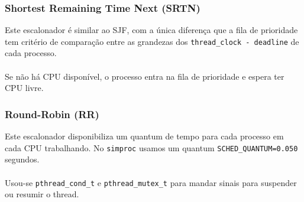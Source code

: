 \documentclass{beamer}
\begin{document}

\begin{frame}
  \frametitle{Shortest Remaining Time Next (SRTN)}
  Este escalonador é similar ao SJF, com a única diferença que a fila de prioridade tem critério de comparação entre as grandezas dos \texttt{thread\_clock - deadline} de cada processo. \\~\\

  Se não há CPU disponível, o processo entra na fila de prioridade e espera ter CPU livre.
\end{frame}

\begin{frame}
  \frametitle{Round-Robin (RR)}
  Este escalonador disponibiliza um quantum de tempo para cada processo em cada CPU trabalhando. No \texttt{simproc} usamos um quantum \texttt{SCHED\_QUANTUM=0.050} segundos. \\~\\

  Usou-se \texttt{pthread\_cond\_t} e \texttt{pthread\_mutex\_t} para mandar sinais para suspender ou resumir o thread.
\end{frame}
\end{document}
